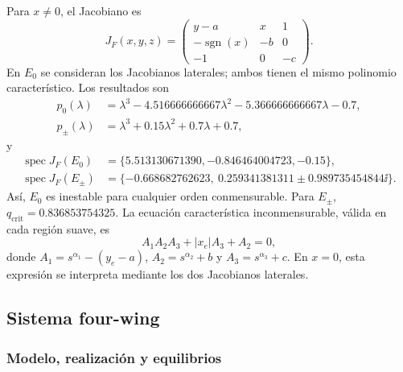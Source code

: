 Para \(x\ne0\), el Jacobiano es
\begin{equation}
 J_F(x,y,z)=\begin{pmatrix}
 y-a&x&1\\-\operatorname{sgn}(x)&-b&0\\-1&0&-c
 \end{pmatrix}.
\end{equation}
En \(E_0\) se consideran los Jacobianos laterales; ambos tienen el mismo
polinomio característico. Los resultados son
\begin{align}
 p_0(\lambda)&=\lambda^3-4.516666666667\lambda^2
 -5.366666666667\lambda-0.7,\\
 p_{\pm}(\lambda)&=\lambda^3+0.15\lambda^2+0.7\lambda+0.7,
\end{align}
y
\begin{align}
 \operatorname{spec}J_F(E_0)&=
 \{5.513130671390,-0.846464004723,-0.15\},\\
 \operatorname{spec}J_F(E_{\pm})&=
 \{-0.668682762623,\ 0.259341381311
 \pm0.989735454844\ii\}.
\end{align}
Así, \(E_0\) es inestable para cualquier orden conmensurable. Para
\(E_{\pm}\), \(q_{\mathrm{crit}}=0.836853754325\). La ecuación característica
inconmensurable, válida en cada región suave, es
\begin{equation}
 A_1A_2A_3+|x_e|A_3+A_2=0,
\end{equation}
donde
\(A_1=s^{\alpha_1}-(y_e-a)\),
\(A_2=s^{\alpha_2}+b\) y
\(A_3=s^{\alpha_3}+c\). En \(x=0\), esta expresión se interpreta mediante los
dos Jacobianos laterales.

\subsection{Sistema four-wing}

\subsubsection*{Modelo, realización y equilibrios}


